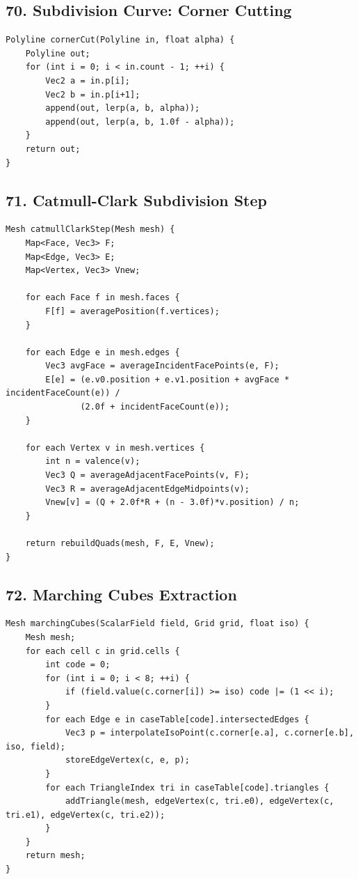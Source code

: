 \documentclass[10pt,letterpaper]{article}
\begin{document}
\subsection{70. Subdivision Curve: Corner Cutting}

\begin{verbatim}
Polyline cornerCut(Polyline in, float alpha) {
    Polyline out;
    for (int i = 0; i < in.count - 1; ++i) {
        Vec2 a = in.p[i];
        Vec2 b = in.p[i+1];
        append(out, lerp(a, b, alpha));
        append(out, lerp(a, b, 1.0f - alpha));
    }
    return out;
}
\end{verbatim}

\subsection{71. Catmull-Clark Subdivision Step}

\begin{verbatim}
Mesh catmullClarkStep(Mesh mesh) {
    Map<Face, Vec3> F;
    Map<Edge, Vec3> E;
    Map<Vertex, Vec3> Vnew;

    for each Face f in mesh.faces {
        F[f] = averagePosition(f.vertices);
    }

    for each Edge e in mesh.edges {
        Vec3 avgFace = averageIncidentFacePoints(e, F);
        E[e] = (e.v0.position + e.v1.position + avgFace * incidentFaceCount(e)) /
               (2.0f + incidentFaceCount(e));
    }

    for each Vertex v in mesh.vertices {
        int n = valence(v);
        Vec3 Q = averageAdjacentFacePoints(v, F);
        Vec3 R = averageAdjacentEdgeMidpoints(v);
        Vnew[v] = (Q + 2.0f*R + (n - 3.0f)*v.position) / n;
    }

    return rebuildQuads(mesh, F, E, Vnew);
}
\end{verbatim}

\subsection{72. Marching Cubes Extraction}

\begin{verbatim}
Mesh marchingCubes(ScalarField field, Grid grid, float iso) {
    Mesh mesh;
    for each cell c in grid.cells {
        int code = 0;
        for (int i = 0; i < 8; ++i) {
            if (field.value(c.corner[i]) >= iso) code |= (1 << i);
        }
        for each Edge e in caseTable[code].intersectedEdges {
            Vec3 p = interpolateIsoPoint(c.corner[e.a], c.corner[e.b], iso, field);
            storeEdgeVertex(c, e, p);
        }
        for each TriangleIndex tri in caseTable[code].triangles {
            addTriangle(mesh, edgeVertex(c, tri.e0), edgeVertex(c, tri.e1), edgeVertex(c, tri.e2));
        }
    }
    return mesh;
}
\end{verbatim}
\end{document}
